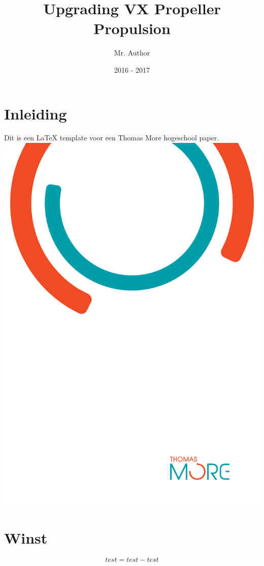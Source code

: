 \documentclass[11pt, a4paper, oneside]{article}
\title{Upgrading VX Propeller Propulsion}
\author{Mr. Author}
\date{2016 - 2017}
\begin{document}

\tableofcontents

\newpage



\chapter{Inleiding}

Dit is een LaTeX template voor een Thomas More hogeschool paper.
 \includegraphics[scale=0.5]{images/ThomasMoreBackground.png}

\newpage

\chapter{Winst}

	\begin{mdframed}[backgroundcolor=grijs!40,shadow=false,roundcorner=8pt]
		$$test = test - test$$
	\end{mdframed}


\end{document}
